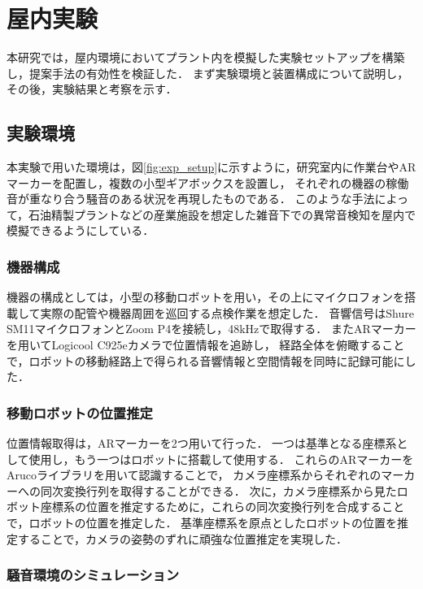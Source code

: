 \documentclass[../main]{subfiles}
\begin{document}
\section{屋内実験} \label{sec:vexp_spectral-reflectance}

本研究では，屋内環境においてプラント内を模擬した実験セットアップを構築し，提案手法の有効性を検証した．
まず実験環境と装置構成について説明し，その後，実験結果と考察を示す．

\subsection{実験環境} \label{subsec:vexp_ref_environmet}

本実験で用いた環境は，図\ref{fig:exp_setup}に示すように，研究室内に作業台やARマーカーを配置し，複数の小型ギアボックスを設置し，
それぞれの機器の稼働音が重なり合う騒音のある状況を再現したものである．
このような手法によって，石油精製プラントなどの産業施設を想定した雑音下での異常音検知を屋内で模擬できるようにしている．

\subsubsection{機器構成} \label{subsubsec:device_config}

機器の構成としては，小型の移動ロボットを用い，その上にマイクロフォンを搭載して実際の配管や機器周囲を巡回する点検作業を想定した．
音響信号はShure SM11マイクロフォンとZoom P4を接続し，48kHzで取得する．
またARマーカーを用いてLogicool C925eカメラで位置情報を追跡し，
経路全体を俯瞰することで，ロボットの移動経路上で得られる音響情報と空間情報を同時に記録可能にした．

\subsubsection{移動ロボットの位置推定}
位置情報取得は，ARマーカーを2つ用いて行った．
一つは基準となる座標系として使用し，もう一つはロボットに搭載して使用する．
これらのARマーカーをArucoライブラリを用いて認識することで，
カメラ座標系からそれぞれのマーカーへの同次変換行列を取得することができる．
次に，カメラ座標系から見たロボット座標系の位置を推定するために，これらの同次変換行列を合成することで，ロボットの位置を推定した．
基準座標系を原点としたロボットの位置を推定することで，カメラの姿勢のずれに頑強な位置推定を実現した．
\subsubsection{騒音環境のシミュレーション} \label{subsubsec:noise_simulation}
\end{document}
